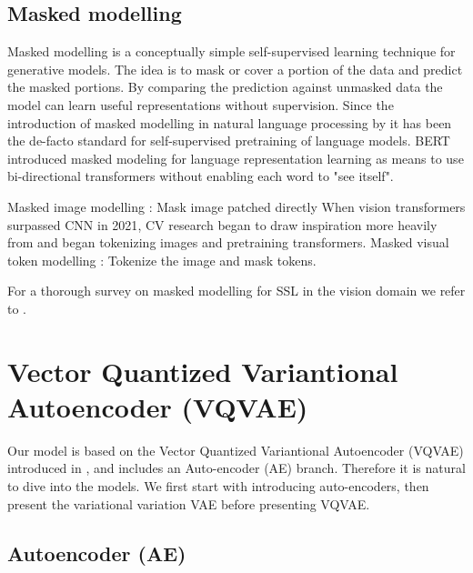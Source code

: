 \documentclass[../../thesis.tex]{subfiles}
\begin{document}
\subsection{Masked modelling}
Masked modelling is a conceptually simple self-supervised learning technique for generative models. The idea is to mask or cover a portion of the data and predict the masked portions. By comparing the prediction against unmasked data the model can learn useful representations without supervision. Since the introduction of masked modelling in natural language processing by \cite{devlin2019bert} it has been the de-facto standard for self-supervised pretraining of language models. BERT introduced masked modeling for language representation learning as means to use bi-directional transformers without enabling each word to "see itself". \newline
{}


Masked image modelling \cite{he2021masked}: Mask image patched directly \newline
When vision transformers \cite{dosovitskiy2021image} surpassed CNN in 2021\cite{he2015deep}, CV research began to draw inspiration more heavily from \cite{devlin2019bert} and began tokenizing images and pretraining transformers.\newline
Masked visual token modelling \cite{chang2022maskgit}: Tokenize the image and mask tokens. \newline




For a thorough survey on masked modelling for SSL in the vision domain we refer to \cite{li2024masked}. 





\section{Vector Quantized Variantional Autoencoder (VQVAE)}
Our model is based on the Vector Quantized Variantional Autoencoder (VQVAE) introduced in \cite{VQVAE}, and includes an Auto-encoder (AE) branch. Therefore it is natural to dive into the models. We first start with introducing auto-encoders, then present the variational variation VAE before presenting VQVAE. 

\subsection{Autoencoder (AE)}
\end{document}

